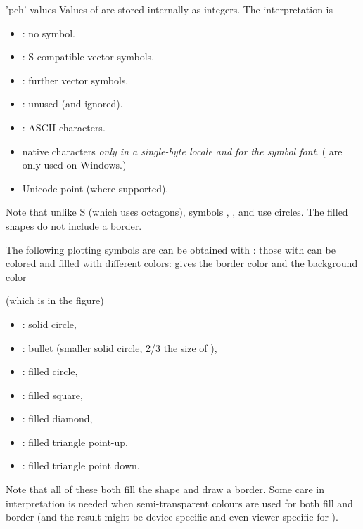 %
\begin{Section}{'pch' values}
Values of  are stored internally as integers.  The
interpretation is
\begin{itemize}

\item {}: no symbol.
\item {}: S-compatible vector symbols.
\item {}: further \R{} vector symbols.
\item {}: unused (and ignored).
\item {}: ASCII characters.
\item {} native characters \emph{only in a
single-byte locale and for the symbol font}.  ( are
only used on Windows.)
\item {} Unicode point (where supported).

\end{itemize}

Note that unlike S (which uses octagons), symbols , ,
 and  use circles.  The filled shapes 
do not include a border.





The following  \R{} plotting symbols are can be obtained with
: those with  can be colored and
filled with different colors:  gives the border color
and  the background color

(which is  in the figure)
\begin{itemize}

\item {}: solid circle,
\item {}: bullet (smaller solid circle,
2/3 the size of ),
\item {}: filled circle,
\item {}: filled square,
\item {}: filled diamond,
\item {}: filled triangle point-up,
\item {}: filled triangle point down.

\end{itemize}

Note that all of these both fill the shape and draw a border.  Some
care in interpretation is needed when semi-transparent colours are
used for both fill and border (and the result might be device-specific
and even viewer-specific for ).


\end{Section}
